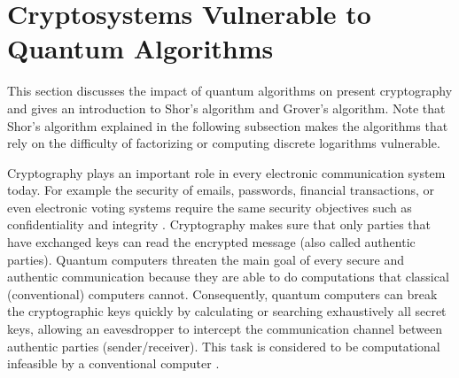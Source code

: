 \documentclass[conference, letterpaper]{IEEEtran}
\begin{document}
\section{Cryptosystems Vulnerable to Quantum Algorithms}

This section discusses the impact of quantum algorithms on present cryptography and gives an introduction to  Shor's algorithm and Grover's algorithm. 
Note that Shor's algorithm explained in the following subsection makes the algorithms that rely on the difficulty of factorizing or computing discrete logarithms vulnerable. 

Cryptography plays an important role in every electronic communication system today. For example the security of emails, passwords, financial transactions, or even electronic voting systems require the same security objectives such as confidentiality and integrity \cite{Campagna2015}. Cryptography makes sure that only parties that have exchanged keys can read the encrypted message (also called authentic parties). Quantum computers threaten the main goal of every secure and authentic communication because they are able to do computations that classical (conventional) computers cannot. Consequently, quantum computers can break the cryptographic keys quickly by calculating or searching exhaustively all secret keys, allowing an eavesdropper to intercept the communication channel between authentic parties (sender/receiver). This task is considered to be computational infeasible by a conventional computer \cite{Buchanan2016}. 
\end{document}
